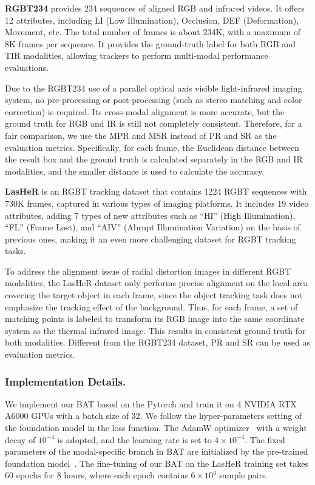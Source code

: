 \documentclass[letterpaper]{article} %
\begin{document}
\textbf{RGBT234} provides 234 sequences of aligned RGB and infrared videos. It offers 12 attributes, including LI (Low Illumination), Occlusion, DEF (Deformation), Movement, etc. The total number of frames is about 234K, with a maximum of 8K frames per sequence.  It provides the ground-truth label for both RGB and TIR modalities, allowing trackers to perform multi-modal performance evaluations.

Due to the RGBT234 use of a parallel optical axis visible light-infrared imaging system, no pre-processing or post-processing (such as stereo matching and color correction) is required. Its cross-modal alignment is more accurate, but the ground truth for RGB and IR is still not completely consistent. Therefore, for a fair comparison, we use the MPR and MSR instead of PR and SR as the evaluation metrics. Specifically, for each frame, the Euclidean distance between the result box and the ground truth is calculated separately in the RGB and IR modalities, and the smaller distance is used to calculate the accuracy.

\textbf{LasHeR} is an RGBT tracking dataset that contains 1224 RGBT sequences with 
730K frames, captured in various types of imaging platforms. It includes 19 video attributes, adding 7 types of new attributes such as ``HI'' (High Illumination), ``FL'' (Frame Lost), and ``AIV'' (Abrupt Illumination Variation) on the basis of previous ones, making it an even more challenging dataset for RGBT tracking tasks.

To address the alignment issue of radial distortion images in different RGBT modalities, the LasHeR dataset only performs precise alignment on the local area covering the target object in each frame, since the object tracking task does not emphasize the tracking effect of the background. Thus, for each frame, a set of matching points is labeled to transform its RGB image into the same coordinate system as the thermal infrared image. This results in consistent ground truth for both modalities. Different from the RGBT234 dataset, PR and SR can be used as evaluation metrics.

\subsubsection{Implementation Details.}
We implement our BAT based on the Pytorch and train it on 4 NVIDIA RTX A6000 GPUs with a batch size of 32.  
We follow the hyper-parameters setting of the foundation model in the loss function. The AdamW optimizer~\cite{loshchilov2019adamw} with a weight decay of $10^{-4}$ is adopted, and the learning rate is set to $4\times 10^{-4}$.
The fixed parameters of the modal-specific branch in BAT are initialized by the pre-trained foundation model~\cite{ye2022joint}. The fine-tuning of our BAT on the LasHeR training set takes 60 epochs for 8 hours, where each epoch contains $6\times 10^{4}$ sample pairs.
\end{document}
